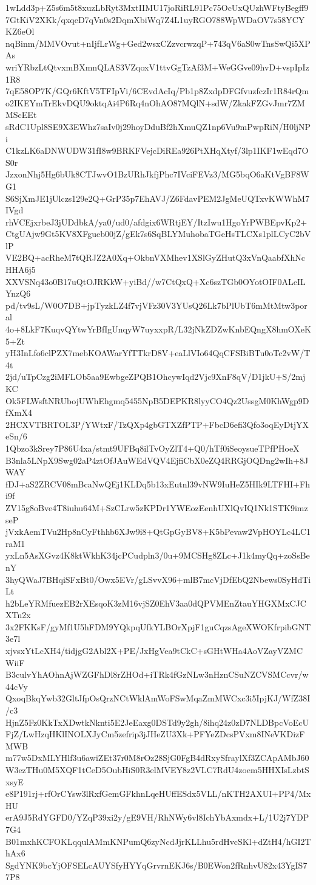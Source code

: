 1wLdd3p+Z5s6m5t8xuzLbRyt3MxtIIMU17joRiRL91Pc75OcUxQUzhWFtyBegff9
7GtKiV2XKk/qxqeD7qVn0s2DqmXbiWq7Z4L1uyRGO788WpWDaOV7s58YCYKZ6eOl
nqBinm/MMVOvut+nIjfLrWg+Ged2wsxCZzvcrwzqP+743qV6aS0wTnsSwQi5XPAs
wriYRbzLtQtvxmBXmnQLAS3VZqoxV1ttvGgTzAf3M+WeGGve09hvD+vspIpIz1R8
7qE58OP7K/GQr6KftV5TFIpVi/6CEvdAcIq/Pb1p8ZxdpDFGfvuzfczIr1R84rQm
o2IKEYmTrEkvDQU9oktqAi4P6Rq4nOhAO87MQlN+sdW/ZkakFZGvJmr7ZMMScEEt
sRdC1Upl8SE9X3EWhz7saIv0j29hoyDduBf2hXmuQZ1np6Vu9mPwpRiN/H0ljNPi
C1kzLK6aDNWUDW31fI8w9BRKFVejcDiREa926PtXHqXtyf/3lp1IKF1wEqd7OS0r
JzxonNhj5Hg6bUk8CTJwvO1BzURhJkfjPhc7IVciFEVz3/MG5bqO6aKtVgBF8WG1
S6SjXmJE1jUlczs129e2Q+GrP35p7EhAVJ/Z6FdavPEM2JgMeUQTxvKWWhM7IVgd
rhVCEjxrbeJ3jUDdbkA/ya0/ud0/afdgix6WRtjEY/ItzIwu1HgoYrPWBEpvKp2+
CtgUAjw9Gt5KV8XFgueb00jZ/gEk7s6SqBLYMuhobaTGeHsTLCXs1plLCyC2bVlP
VE2BQ+acRheM7tQRJZ2A0Xq+OkbnVXMhev1XSlGyZHutQ3xVnQaabfXhNcHHA6j5
XXVSNq43o0B17uQtOJRKkW+yiBd//w7CtQxQ+Xc6szTGb0OYotOIF0ALcILYnzQ6
pd/tv9sL/W0O7DB+jpTyzkLZ4f7vjVFz30V3YUsQ26Lk7bPlUbT6mMtMtw3poral
4o+8LkF7KuqvQYtwYrBfIgUnqyW7uyxxpR/L32jNkZDZwKnbEQngX8hmOXeK5+Zt
yH3InLfo6clPZX7mebKOAWarYfTTkrD8V+eaLlVIo64QqCFSBiBTu0oTc2vW/T4t
2jd/uTpCzg2iMFLOb5aa9EwbgeZPQB1OhcywIqd2Vjc9XnF8qV/D1jkU+S/2mjKC
Ok5FLWsftNRUbojUWhEhgmq5455NpB5DEPKR8lyyCO4Qz2UssgM0KhWgp9DfXmX4
2HCXVTBRTOL3P/YWtxF/TzQXp4gbGTXZfPTP+FbcD6efi3Qfo3oqEyDtjYXeSn/6
1Qbzo3kSrey7P86U4xa/stmt9UFBq8ilTvOyZlT4+Q0/hTf0iSeoysueTPfPHoeX
B3nla5LNpX9Swg02aP4ztOfJAuWEdVQV4EjfiCbX0eZQ4RRGjOQDng2wIh+8JWAY
fDJ+aS2ZRCV08mBcaNwQEj1KLDq5b13xEutnl39vNW9IuHeZ5HIk9LTFHI+Fhi9f
ZV15g8oBve4T8iuhu64M+SzCLrw5zKPDr1YWEozEenhUXlQvIQ1Nk1STK9imzseP
jVxkAemTVu2Hp8nCyFthhb6XJw9i8+QtGpGyBV8+K5bPevaw2VpHOYLc4LC1raM1
yxLn5AsXGvz4K8ktWkhK34jcPCudpln3/0u+9MCSHg8ZLc+J1k4myQq+zoSsBenY
3hyQWaJ7BHqiSFxBt0/Owx5EVr/gLSvvX96+mlB7mcVjDfEbQ2Nbews0SyHdTiLt
h2bLeYRMfuezEB2rXEsqoK3zM16vjSZ0EhV3aa0dQPVMEnZtauYHGXMxCJCXTn2x
3x2FKKsF/gyMf1U5hFDM9YQkpqUfkYLBOrXpjF1guCqzsAgeXWOKfrpibGNT3e7l
xjvsxYtLcXH4/tidjgG2Abl2X+PE/JxHgVea9tCkC+sGHtWHa4AoVZayVZMCWiiF
B3culvYhAOhnAjWZGFhDl8rZHOd+iTRk4fGzNLw3nHznCSuNZCVSMCcvr/w44cVy
QxoqBkqYwb32GltJfpOsQrzNCtWklAmWoFSwMqaZmMWCxc3i5IpjKJ/WfZ38I/c3
HjnZ5Fz0KkTxXDwtkNknti5E2JeEaxg0DSTd9y2gh/8ihq24z0zD7NLDBpcVoEcU
FjZ/LwHzqHKlINOLXJyCm5zefrip3jJHeZU3Xk+PFYeZDcsPVxm8INeVKDizFMWB
m77w5DxMLYHlf3u6awiZEt37r0M8rOz28SjG0FgB4dRxySfraylXf3ZCApAMbJ60
W3ezTHu0M5XQF1tCeD5OubHiS0R3elMVEY8z2VLC7RdU4zoem5HHXIsLzbtSxsyE
e8P191rj+rfOrCYsw3lRxfGemGFkhnLqeHUffESdx5VLL/nKTH2AXUI+PP4/MxHU
erA9J5RdYGFD0/YZqP39xi2y/gE9VH/RhNWy6vl8IchYbAxmdx+L/1U2j7YDP7G4
B01mxhKCFOKLqqulAMmKNPumQ6zyNcdJjrKLLhu5rdHvcSKl+dZtH4/hGI2ThAx6
SgdYNK9bcYjOFSELcAUYSfyHYYqGrvrnEKJ6s/B0EWon2fRnhvU82x43YgIS77P8
